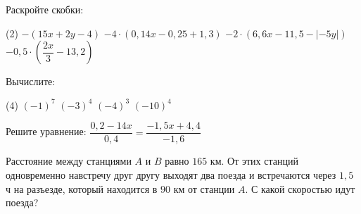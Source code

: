 \begin{homework}[number=2]
	\begin{listofex}
		\item Раскройте скобки:
		\begin{tasks}(2)
			\task \( -(15x+2y-4) \)
			\task \( -4 \cdot (0,14x-0,25+1,3) \)
			\task \( -2 \cdot(6,6x-11,5 -|-5y|) \)
			\task \( -0,5 \cdot \left( \dfrac{ 2x }{ 3 }-13,2 \right) \)
		\end{tasks}
		\item Вычислите:
		\begin{tasks}(4)
			\task \( (-1)^7 \)
			\task \( (-3)^{4} \)
			\task \( (-4)^3 \)
			\task \( (-10)^{4} \)
		\end{tasks}
		\item Решите уравнение: \( \dfrac{ 0,2-14x }{ 0,4 }=\dfrac{ -1,5x+4,4 }{ -1,6 } \)
		\item Расстояние между станциями \(A\) и \(B\) равно \(165\) км. От этих станций одновременно навстречу друг другу выходят два поезда и встречаются через \(1,5\) ч на разъезде, который находится в \(90\) км от станции \(A\). С какой скоростью идут поезда?
	\end{listofex}
\end{homework}

